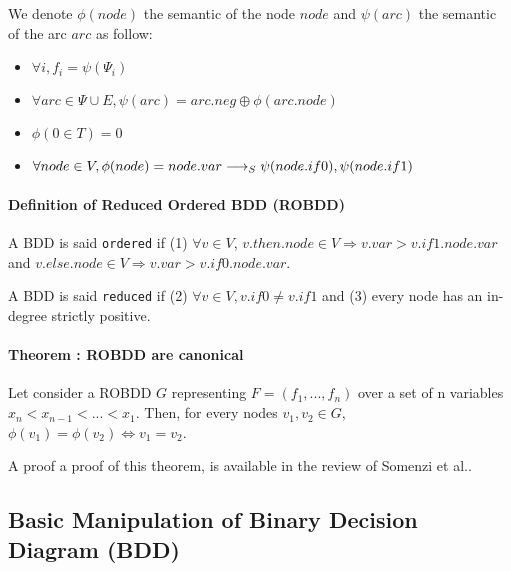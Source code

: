 \documentclass[a4paper,10pt]{article}
\begin{document}

We denote $\phi(node)$ the semantic of the node $node$ and $\psi(arc)$ the semantic of the arc $arc$ as follow:\begin{itemize}
\item $\forall i, f_i = \psi(\Psi_i)$
\item $\forall arc \in \Psi \cup E, \psi(arc) = arc.neg \oplus \phi(arc.node)$
\item $\phi(0 \in T) = 0$
\item $\forall node \in V, \phi(node) = node.var \longrightarrow_S \psi(node.if0), \psi(node.if1)$
\end{itemize}

\paragraph{Definition of Reduced Ordered BDD (ROBDD)\\}
A BDD is said \texttt{ordered} if (1) $\forall v\in V$, $v.then.node \in V \Rightarrow v.var > v.if1.node.var$ and $v.else.node \in V \Rightarrow v.var > v.if0.node.var$.

A BDD is said \texttt{reduced} if (2) $\forall v\in V, v.if0 \neq v.if1$ and (3) every node has an in-degree strictly positive.

\paragraph{Theorem : ROBDD are canonical\\}

Let consider a ROBDD $G$ representing $F=(f_1, ..., f_n)$ over a set of n variables $x_n < x_{n-1} < ... < x_1$. Then, for every nodes $v_1, v_2 \in G$, $\phi(v_1) = \phi(v_2) \Leftrightarrow v_1 = v_2$.

A proof a proof of this theorem, is available in the review of Somenzi et al.\cite{Somenzi1999}.

\subsection{Basic Manipulation of Binary Decision Diagram (BDD)}
\end{document}
